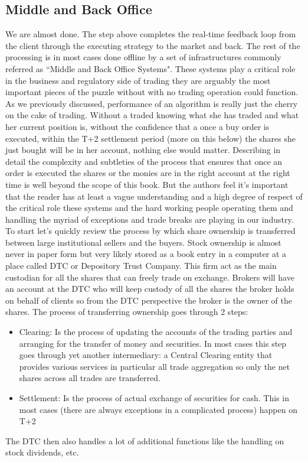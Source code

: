 \subsection{Middle and Back Office}
We are almost done. The step above completes the real-time feedback loop from the client through the executing strategy to the market and back. The rest of the processing is in most cases done offline by a set of infrastructures commonly referred as ``Middle and Back Office Systems". These systems play a critical role in the business and regulatory side of trading they are arguably the most important pieces of the puzzle without with no trading operation could function. As we previously discussed, performance of an algorithm is really just the cherry on the cake of trading. Without a traded knowing what she has traded and what her current position is, without the confidence that a once a buy order is executed, within the T+2 settlement period (more on this below) the shares she just bought will be in her account, nothing else would matter. Describing in detail the complexity and subtleties of the process that ensures that once an order is executed the shares or the monies are in the right account at the right time is well beyond the scope of this book. But the authors feel it's important that the reader has at least a vague understanding and a high degree of respect of the critical role these systems and the hard working people operating them and handling the myriad of exceptions and trade breaks are playing in our industry.\\

To start let's quickly review the process by which share ownership is transferred between large institutional sellers and the buyers. Stock ownership is almost never in paper form but very likely stored as a book entry in a computer at a place called DTC or Depository Trust Company. This firm act as the main custodian for all the shares that can freely trade on exchange. Brokers will have an account at the DTC who will keep custody of all the shares the broker holds on behalf of clients so from the DTC perspective the broker is the owner of the shares. The process of transferring ownership goes through 2 steps:
\begin{itemize}
\item Clearing: Is the process of updating the accounts of the trading parties and arranging for the transfer of money and securities. In most cases this step goes through yet another intermediary: a Central Clearing entity that provides various services in particular all trade aggregation so only the net shares across all trades are  transferred.
\item Settlement: Is the process of actual exchange of securities for cash. This in most cases (there are always exceptions in a complicated process) happen on T+2
\end{itemize}
The DTC then also handles a lot of additional functions like the handling on stock dividends, etc.\\


